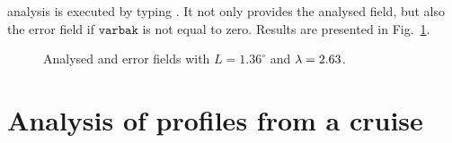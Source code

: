 \diva analysis is executed by typing . It not only provides the analysed field, but also the error field if $\texttt{varbak}$ is not equal to zero. Results are presented in Fig.~\ref{fig:medsea_results_paper_SNR1}.

\begin{figure}[htpb]
\centering
{}
\caption{Analysed and error fields with $L=1.36^{\circ}$ and $\lambda=2.63$.\label{fig:medsea_results_paper_SNR1}}
\end{figure}



\clearpage
%




%
%








\section{Analysis of profiles from a cruise\label{sec:cruise}}

